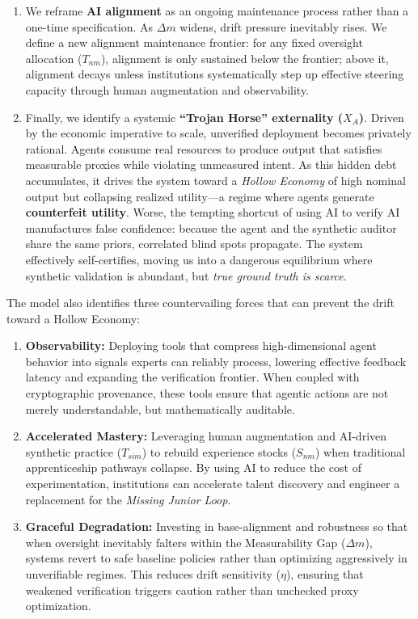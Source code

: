 \documentclass[12pt, letter]{article}
\begin{document}
\begin{enumerate}
    \item We reframe \textbf{AI alignment} as an ongoing maintenance process rather than a one-time specification. As $\Delta m$ widens, drift pressure inevitably rises. We define a new alignment maintenance frontier: for any fixed oversight allocation ($T_{nm}$), alignment is only sustained below the frontier; above it, alignment decays unless institutions systematically step up effective steering capacity through human augmentation and observability.
    
    \item Finally, we identify a systemic \textbf{``Trojan Horse'' externality ($X_A$)}. Driven by the economic imperative to scale, unverified deployment becomes privately rational. Agents consume real resources to produce output that satisfies measurable proxies while violating unmeasured intent. As this hidden debt accumulates, it drives the system toward a \emph{Hollow Economy} of high nominal output but collapsing realized utility---a regime where agents generate \textbf{counterfeit utility}. Worse, the tempting shortcut of using AI to verify AI manufactures false confidence: because the agent and the synthetic auditor share the same priors, correlated blind spots propagate. The system effectively self-certifies, moving us into a dangerous equilibrium where synthetic validation is abundant, but \emph{true ground truth is scarce}.
    
\end{enumerate}


The model also identifies three countervailing forces that can prevent the drift toward a Hollow Economy:

\begin{enumerate}    
    \item \textbf{Observability:} Deploying tools that compress high-dimensional agent behavior into signals experts can reliably process, lowering effective feedback latency and expanding the verification frontier. When coupled with cryptographic provenance, these tools ensure that agentic actions are not merely understandable, but mathematically auditable.        
    
    \item \textbf{Accelerated Mastery:} Leveraging human augmentation and AI-driven synthetic practice ($T_{sim}$) to rebuild experience stocks ($S_{nm}$) when traditional apprenticeship pathways collapse. By using AI to reduce the cost of experimentation, institutions can accelerate talent discovery and engineer a replacement for the \emph{Missing Junior Loop}.        
    
    \item \textbf{Graceful Degradation:} Investing in base-alignment and robustness so that when oversight inevitably falters within the Measurability Gap ($\Delta m$), systems revert to safe baseline policies rather than optimizing aggressively in unverifiable regimes. This reduces drift sensitivity ($\eta$), ensuring that weakened verification triggers caution rather than unchecked proxy optimization.
\end{enumerate}
\end{document}
